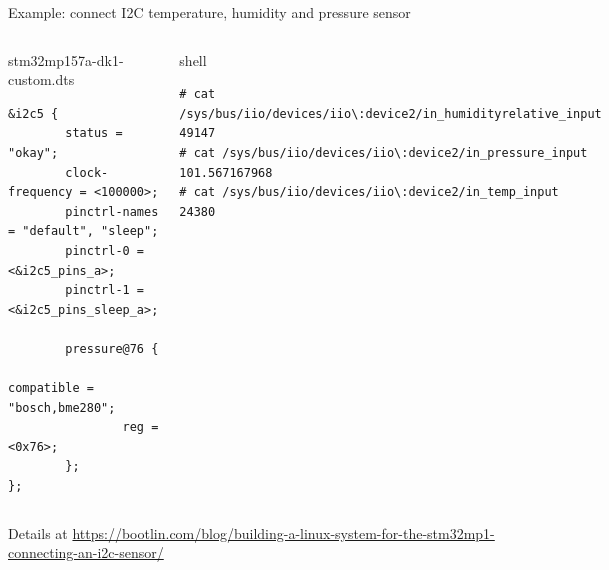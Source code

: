 \begin{frame}[fragile]{Example: connect I2C temperature, humidity and pressure sensor}
  \begin{columns}
    \begin{block}{stm32mp157a-dk1-custom.dts}
      {\tiny
\begin{verbatim}
&i2c5 {
        status = "okay";
        clock-frequency = <100000>;
        pinctrl-names = "default", "sleep";
        pinctrl-0 = <&i2c5_pins_a>;
        pinctrl-1 = <&i2c5_pins_sleep_a>;

        pressure@76 {
                compatible = "bosch,bme280";
                reg = <0x76>;
        };
};
\end{verbatim}
}
  \end{block}

\begin{block}{shell}
{\tiny
\begin{verbatim}
# cat /sys/bus/iio/devices/iio\:device2/in_humidityrelative_input
49147
# cat /sys/bus/iio/devices/iio\:device2/in_pressure_input
101.567167968
# cat /sys/bus/iio/devices/iio\:device2/in_temp_input
24380
\end{verbatim}
}
\end{block}
  \begin{center}
    \includegraphics[width=\textwidth]{slides/sysdev-hw-devices/cn13-pinout.png}\\
    \includegraphics[width=0.4\textwidth]{slides/sysdev-hw-devices/bme.jpg}
  \end{center}
\end{columns}
\vspace{0.5cm}
Details at
\url{https://bootlin.com/blog/building-a-linux-system-for-the-stm32mp1-connecting-an-i2c-sensor/}

\end{frame}

